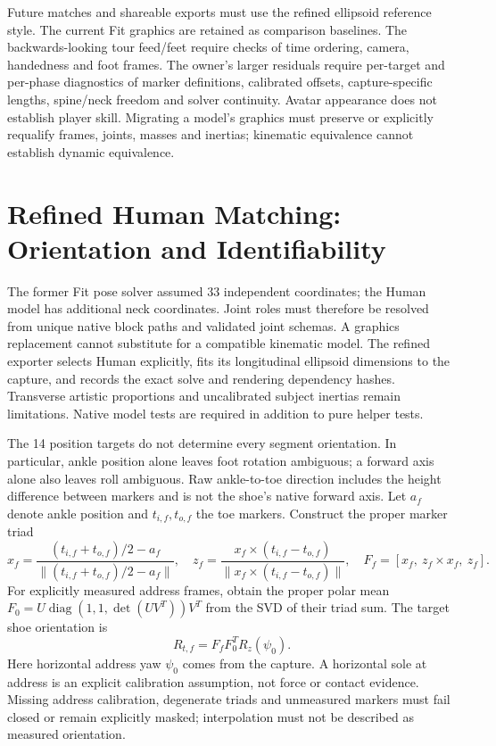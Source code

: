 \documentclass[11pt,a4paper]{article}
\begin{document}
Future matches and shareable exports must use the refined ellipsoid reference
style. The current Fit graphics are retained as comparison baselines. The
backwards-looking tour feed/feet require checks of time ordering, camera,
handedness and foot frames. The owner's larger residuals require per-target
and per-phase diagnostics of marker definitions, calibrated offsets,
capture-specific lengths, spine/neck freedom and solver continuity.
Avatar appearance does not establish player skill. Migrating a model's graphics
must preserve or explicitly requalify frames, joints, masses and inertias;
kinematic equivalence cannot establish dynamic equivalence.


\section{Refined Human Matching: Orientation and Identifiability}
The former Fit pose solver assumed 33 independent coordinates; the Human
model has additional neck coordinates. Joint roles must therefore be resolved
from unique native block paths and validated joint schemas. A graphics
replacement cannot substitute for a compatible kinematic model. The refined
exporter selects Human explicitly, fits its longitudinal ellipsoid dimensions
to the capture, and records the exact solve and rendering dependency hashes.
Transverse artistic proportions and uncalibrated subject inertias remain
limitations. Native model tests are required in addition to pure helper tests.

The 14 position targets do not determine every segment orientation. In
particular, ankle position alone leaves foot rotation ambiguous; a forward
axis alone also leaves roll ambiguous. Raw ankle-to-toe direction includes
the height difference between markers and is not the shoe's native forward
axis. Let $a_f$ denote ankle position and $t_{i,f},t_{o,f}$ the toe markers.
Construct the proper marker triad
\[
 x_f=\frac{(t_{i,f}+t_{o,f})/2-a_f}{\|(t_{i,f}+t_{o,f})/2-a_f\|},\quad
 z_f=\frac{x_f\times(t_{i,f}-t_{o,f})}{\|x_f\times(t_{i,f}-t_{o,f})\|},\quad
 F_f=[x_f,\ z_f\times x_f,\ z_f].
\]
For explicitly measured address frames, obtain the proper polar mean
$F_0=U\operatorname{diag}(1,1,\det(UV^T))V^T$ from the SVD of their triad sum.
The target shoe orientation is
\[
 R_{t,f}=F_fF_0^TR_z(\psi_0).
\]
Here horizontal address yaw $\psi_0$ comes from the capture. A horizontal sole
at address is an explicit calibration assumption, not force or contact
evidence. Missing address calibration, degenerate triads and unmeasured
markers must fail closed or remain explicitly masked; interpolation must not
be described as measured orientation.
\end{document}
